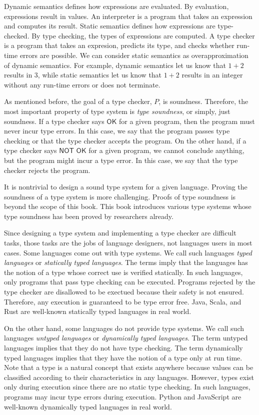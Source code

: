 Dynamic semantics defines how expressions are evaluated. By evaluation,
expressions result in values. An interpreter is a program that takes an
expression and computes its result. Static semantics defines how expressions are
type-checked. By type checking, the types of expressions are computed. A type
checker is a program that takes an expresion, predicts its type, and checks
whether run-time errors are possible. We can consider static semantics as
overapproximation of dynamic semantics. For example, dynamic semantics let us
know that $1+2$ results in $3$, while static semantics let us know that $1+2$
results in an integer without any run-time errors or does not terminate.

As mentioned before, the goal of a type checker, $P$, is soundness. Therefore,
the most important property of type system is \textit{type soundness}, or simply, just soundness. If a type checker says $\textsf{OK}$ for
a given program, then the program must never incur type errors. In this
case, we say that the program passes type checking or that the type checker accepts
the program. On the other hand, if a type checker says $\textsf{NOT OK}$ for a
given program, we cannot conclude anything, but the program might incur a type
error. In this case, we say that the type checker rejects the program.

It is nontrivial to design a sound type system for a given language. Proving the
soundness of a type system is more challenging. Proofs of type soundness is
beyond the scope of this book. This book introduces various type systems whose
type soundness has been proved by researchers already.

Since designing a type system and implementing a type checker are
difficult tasks, those tasks are the jobs of language designers, not languages
users in most cases. Some languages come out with type systems. We call such languages
\textit{typed languages} or \textit{statically typed
languages}. The terms imply that the languages
has the notion of a type whose correct use is verified statically.
In such languages, only programs
that pass type checking can be executed. Programs rejected by the type checker
are disallowed to be exectued because their safety is not ensured. Therefore,
any execution is guaranteed to be type error free. Java, Scala,
and Rust are well-known statically typed languages in real world.

On the other hand, some languages do not provide type systems. We call such
languages \textit{untyped languages} or
\textit{dynamically typed languages}.
The term untyped languages implies that they do not have type checking.
The term dynamically typed languages implies that they have the notion of a type
only at run time. Note that a type is a natural concept that exists anywhere
because values can be classified according to their characteristics in any
languages. However, types exist only during execution since there are no static
type checking. In such languages, programs may incur type errors during execution.
Python and JavaScript are well-known dynamically typed languages in real world.


